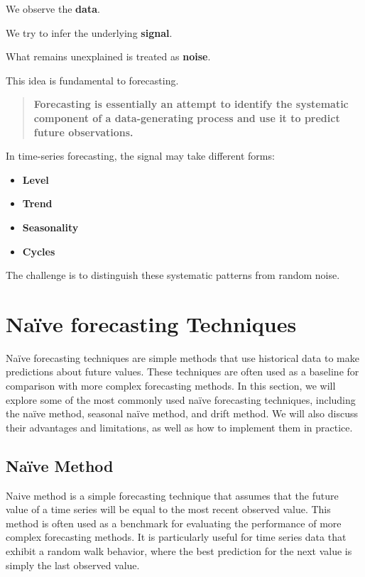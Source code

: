 \documentclass[
  a4paper,
]{article}
\providecommand{\tightlist}{%
  \setlength{\itemsep}{0pt}\setlength{\parskip}{0pt}}
\begin{document}
We observe the \textbf{data}.

We try to infer the underlying \textbf{signal}.

What remains unexplained is treated as \textbf{noise}.

This idea is fundamental to forecasting.

\begin{quote}
\textbf{Forecasting is essentially an attempt to identify the systematic
component of a data-generating process and use it to predict future
observations.}
\end{quote}

In time-series forecasting, the signal may take different forms:

\begin{itemize}
\tightlist
\item
  \textbf{Level}
\item
  \textbf{Trend}
\item
  \textbf{Seasonality}
\item
  \textbf{Cycles}
\end{itemize}

The challenge is to distinguish these systematic patterns from random
noise.

\section{Naïve forecasting
Techniques}\label{nauxefve-forecasting-techniques}

Naïve forecasting techniques are simple methods that use historical data
to make predictions about future values. These techniques are often used
as a baseline for comparison with more complex forecasting methods. In
this section, we will explore some of the most commonly used naïve
forecasting techniques, including the naïve method, seasonal naïve
method, and drift method. We will also discuss their advantages and
limitations, as well as how to implement them in practice.

\subsection{Naïve Method}\label{nauxefve-method}

Naive method is a simple forecasting technique that assumes that the
future value of a time series will be equal to the most recent observed
value. This method is often used as a benchmark for evaluating the
performance of more complex forecasting methods. It is particularly
useful for time series data that exhibit a random walk behavior, where
the best prediction for the next value is simply the last observed
value.
\end{document}
